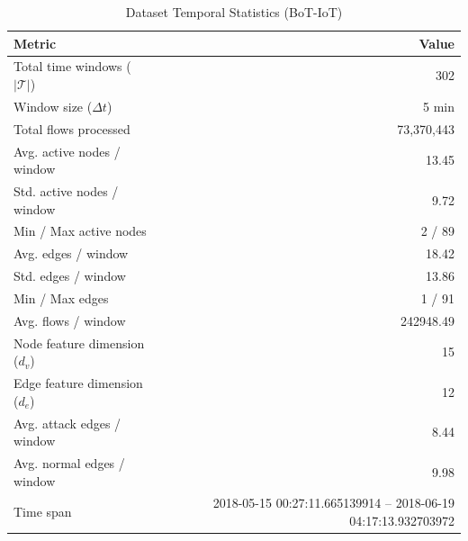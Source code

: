 \begin{table}[ht]
\centering
\caption{Dataset Temporal Statistics (BoT-IoT)}
\label{tab:temporal_stats}
\begin{tabular}{l r}
\toprule
Metric & Value \\
\midrule
Total time windows ($|\mathcal{T}|$) & 302 \\
Window size ($\Delta t$) & 5 min \\
Total flows processed & 73,370,443 \\
Avg. active nodes / window & 13.45 \\
Std. active nodes / window & 9.72 \\
Min / Max active nodes & 2 / 89 \\
Avg. edges / window & 18.42 \\
Std. edges / window & 13.86 \\
Min / Max edges & 1 / 91 \\
Avg. flows / window & 242948.49 \\
Node feature dimension ($d_v$) & 15 \\
Edge feature dimension ($d_e$) & 12 \\
Avg. attack edges / window & 8.44 \\
Avg. normal edges / window & 9.98 \\
Time span & 2018-05-15 00:27:11.665139914 -- 2018-06-19 04:17:13.932703972 \\
\bottomrule
\end{tabular}
\end{table}
